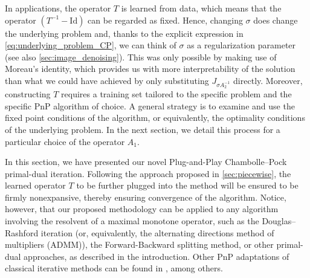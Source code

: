 \documentclass[onefignum,onetabnum]{siamonline250211}
\begin{document}
In applications, the operator $T$ is learned from data, which means that the operator $(T^{-1}-\mathrm{Id})$ can be regarded as fixed. Hence, changing $\sigma$ does change the underlying problem and, thanks to the explicit expression in \cref{eq:underlying_problem_CP}, we can think of $\sigma$ as a regularization parameter (see also \cref{sec:image_denoising}). This was only possible by making use of Moreau's identity, which provides us with more interpretability of the solution than what we could have achieved by only substituting $J_{\sigma A_2^{-1}}$ directly. Moreover, constructing $T$ requires a training set tailored to the specific problem and the specific PnP algorithm of choice. A general strategy is to examine and use the fixed point conditions of the algorithm, or equivalently, the optimality conditions of the underlying problem. In the next section, we detail this process for a particular choice of the operator $A_1$.

In this section, we have presented our novel Plug-and-Play Chambolle--Pock primal-dual iteration. Following the approach proposed in \cref{sec:piecewise},  the learned operator $T$ to be further plugged into the method will be ensured to be firmly nonexpansive, thereby ensuring convergence of the algorithm. Notice, however, that our proposed methodology can be applied to any algorithm involving the resolvent of a maximal monotone operator, such as the Douglas--Rashford iteration (or, equivalently, the alternating directions method of multipliers (ADMM)), the Forward-Backward splitting method, or other primal-dual approaches, as described in the introduction. Other PnP adaptations of classical iterative methods can be found in \cite{pescterr2021,ryupnp2019,Santos2024,Sun2021,Suzuki2024,venkat2013}, among others. 
\end{document}
